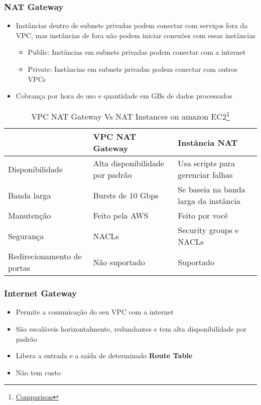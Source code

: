 \begin{frame}[allowframebreaks]
	\frametitle{NAT Gateway}
	\begin{itemize}
		\item Instâncias dentro de subnets privadas podem conectar com serviços fora da VPC, mas instâncias de fora não podem iniciar conexões com essas instâncias
			\begin{itemize}
				\item Public: Instâncias em subnets privadas podem conectar com a internet
				\item Private: Instâncias em subnets privadas podem conectar com outros VPCs
			\end{itemize}
		\item Cobrança por hora de uso e quantidade em GBs de dados processados
	\end{itemize}
	\framebreak
	\begin{scriptsize}
	\begin{table}[htpb]
		\centering
		\caption{VPC NAT Gateway Vs NAT Instances on amazon EC2\footnote{\href{https://docs.aws.amazon.com/vpc/latest/userguide/vpc-nat-comparison.html}{Comparison}}}
		\begin{tabular}{|p{3cm}|p{3cm}|p{3cm}|}
			\hline
			& VPC NAT Gateway & Instância NAT  \\
			\hline \hline
			Disponibilidade & Alta disponibilidade por padrão & Usa scripts para gerenciar falhas \\
			\hline
			Banda larga & Bursts de 10 Gbps & Se baseia na banda larga da instância \\
			\hline
			Manutenção & Feito pela AWS & Feito por você \\
			\hline
			Segurança & NACLs & Security groups e NACLs \\
			\hline
			Redirecionamento de portas & Não suportado & Suportado \\
			\hline
		\end{tabular}
	\end{table}
	\end{scriptsize}
\end{frame}

\begin{frame}
	\frametitle{Internet Gateway}
	\begin{itemize}
		\item Permite a comunicação do seu VPC com a internet
		\item São escaláveis horizontalmente, redundantes e tem alta disponibilidade por padrão
		\item Libera a entrada e a saída de determinado \textbf{Route Table}
		\item Não tem custo
	\end{itemize}
\end{frame}

